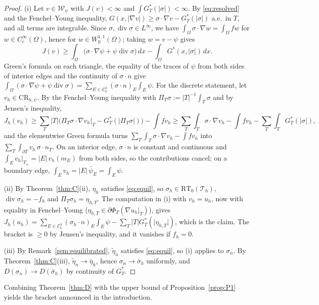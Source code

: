 \documentclass[11pt]{amsart}
\theoremstyle{definition}
\theoremstyle{remark}
\numberwithin{equation}{section}
\newcommand{\dx}{\,dx}
\newcommand{\abs}[1]{\lvert #1\rvert}
\newcommand{\CR}{\mathrm{CR}}
\newcommand{\RT}{\mathrm{RT}_0}
\newcommand{\Th}{\mathcal T_h}
\newcommand{\Eb}{\mathcal E_h^{\partial}}
\newcommand{\Wc}{\mathcal W}
\DeclareMathOperator{\divg}{div}
\begin{document}
\begin{proof}
(i) Let $v\in\Wc_\psi$ with $J(v)<\infty$ and $\int G_T^*(\abs\sigma)<\infty$. By \eqref{eq:resolved} and the Fenchel--Young inequality, $G(x,\abs{\nabla v})\ge\sigma\cdot\nabla v-G_T^*(\abs\sigma)$ a.e.\ in $T$, and all terms are integrable. Since $\sigma,\divg\sigma\in L^\infty$, we have $\int_\Omega\sigma\cdot\nabla w=\int_\Omega fw$ for $w\in C^\infty_c(\Omega)$, hence for $w\in W^{1,1}_0(\Omega)$; taking $w=v-\psi$ gives
\[
J(v)\ge\int_\Omega\big(\sigma\cdot\nabla\psi+\psi\divg\sigma\big)\dx-\int_\Omega G^*(x,\abs\sigma)\dx .
\]
Green's formula on each triangle, the equality of the traces of $\psi$ from both sides of interior edges and the continuity of $\sigma\cdot n$ give $\int_\Omega(\sigma\cdot\nabla\psi+\psi\divg\sigma)=\sum_{E\in\Eb}(\sigma\cdot n)_E\int_E\psi$. For the discrete statement, let $v_h\in\CR_{h,\psi}$. By the Fenchel--Young inequality with $\Pi_T\sigma:=\abs T^{-1}\int_T\sigma$ and by Jensen's inequality,
\[
J_h(v_h)\ge\sum_T\abs T\big(\Pi_T\sigma\cdot\nabla v_h|_T-G_T^*(\abs{\Pi_T\sigma})\big)-\int fv_h\ge\sum_T\int_T\sigma\cdot\nabla v_h-\int fv_h-\sum_T\int_TG_T^*(\abs\sigma),
\]
and the elementwise Green formula turns $\sum_T\int_T\sigma\cdot\nabla v_h-\int fv_h$ into $\sum_T\int_{\partial T}v_h\,\sigma\cdot n_T$. On an interior edge, $\sigma\cdot n$ is constant and continuous and $\int_Ev_h|_{T_\pm}=\abs E\,v_h(m_E)$ from both sides, so the contributions cancel; on a boundary edge, $\int_Ev_h=\abs E\,\bar\psi_E=\int_E\psi$.

(ii) By Theorem~\ref{thm:C}(ii), $\eta_h$ satisfies \eqref{eq:equil}, so $\sigma_h\in\RT(\Th)$, $\divg\sigma_h=-f_h$ and $\Pi_T\sigma_h=\eta_{h,T}$. The computation in (i) with $v_h=u_h$, now with equality in Fenchel--Young ($\eta_{h,T}\in\partial\Phi_T(\nabla u_h|_T)$), gives $J_h(u_h)=\sum_{E\in\Eb}(\sigma_h\cdot n)_E\int_E\psi-\sum_T\abs TG_T^*(\abs{\eta_{h,T}})$, which is the claim. The bracket is $\ge0$ by Jensen's inequality, and it vanishes if $f_h=0$.

(iii) By Remark~\ref{rem:equilibrated}, $\tilde\eta_n$ satisfies \eqref{eq:equil}, so (i) applies to $\sigma_n$. By Theorem~\ref{thm:C}(iii), $\tilde\eta_n\to\bar\eta_h$, hence $\sigma_n\to\bar\sigma_h$ uniformly, and $D(\sigma_n)\to D(\bar\sigma_h)$ by continuity of $G_T^*$.
\end{proof}

Combining Theorem~\ref{thm:D} with the upper bound of Proposition~\ref{prop:P1} yields the bracket announced in the introduction.
\end{document}
